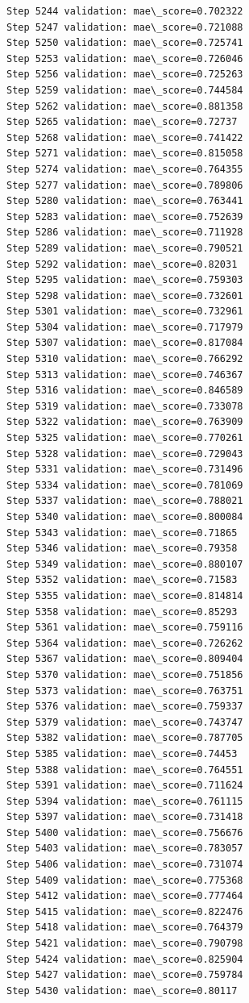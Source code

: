 \documentclass[11pt]{article}
\begin{document}
\begin{Verbatim}[commandchars=\\\{\}]
Step 5244 validation: mae\_score=0.702322
Step 5247 validation: mae\_score=0.721088
Step 5250 validation: mae\_score=0.725741
Step 5253 validation: mae\_score=0.726046
Step 5256 validation: mae\_score=0.725263
Step 5259 validation: mae\_score=0.744584
Step 5262 validation: mae\_score=0.881358
Step 5265 validation: mae\_score=0.72737
Step 5268 validation: mae\_score=0.741422
Step 5271 validation: mae\_score=0.815058
Step 5274 validation: mae\_score=0.764355
Step 5277 validation: mae\_score=0.789806
Step 5280 validation: mae\_score=0.763441
Step 5283 validation: mae\_score=0.752639
Step 5286 validation: mae\_score=0.711928
Step 5289 validation: mae\_score=0.790521
Step 5292 validation: mae\_score=0.82031
Step 5295 validation: mae\_score=0.759303
Step 5298 validation: mae\_score=0.732601
Step 5301 validation: mae\_score=0.732961
Step 5304 validation: mae\_score=0.717979
Step 5307 validation: mae\_score=0.817084
Step 5310 validation: mae\_score=0.766292
Step 5313 validation: mae\_score=0.746367
Step 5316 validation: mae\_score=0.846589
Step 5319 validation: mae\_score=0.733078
Step 5322 validation: mae\_score=0.763909
Step 5325 validation: mae\_score=0.770261
Step 5328 validation: mae\_score=0.729043
Step 5331 validation: mae\_score=0.731496
Step 5334 validation: mae\_score=0.781069
Step 5337 validation: mae\_score=0.788021
Step 5340 validation: mae\_score=0.800084
Step 5343 validation: mae\_score=0.71865
Step 5346 validation: mae\_score=0.79358
Step 5349 validation: mae\_score=0.880107
Step 5352 validation: mae\_score=0.71583
Step 5355 validation: mae\_score=0.814814
Step 5358 validation: mae\_score=0.85293
Step 5361 validation: mae\_score=0.759116
Step 5364 validation: mae\_score=0.726262
Step 5367 validation: mae\_score=0.809404
Step 5370 validation: mae\_score=0.751856
Step 5373 validation: mae\_score=0.763751
Step 5376 validation: mae\_score=0.759337
Step 5379 validation: mae\_score=0.743747
Step 5382 validation: mae\_score=0.787705
Step 5385 validation: mae\_score=0.74453
Step 5388 validation: mae\_score=0.764551
Step 5391 validation: mae\_score=0.711624
Step 5394 validation: mae\_score=0.761115
Step 5397 validation: mae\_score=0.731418
Step 5400 validation: mae\_score=0.756676
Step 5403 validation: mae\_score=0.783057
Step 5406 validation: mae\_score=0.731074
Step 5409 validation: mae\_score=0.775368
Step 5412 validation: mae\_score=0.777464
Step 5415 validation: mae\_score=0.822476
Step 5418 validation: mae\_score=0.764379
Step 5421 validation: mae\_score=0.790798
Step 5424 validation: mae\_score=0.825904
Step 5427 validation: mae\_score=0.759784
Step 5430 validation: mae\_score=0.80117

\end{Verbatim}
\end{document}
